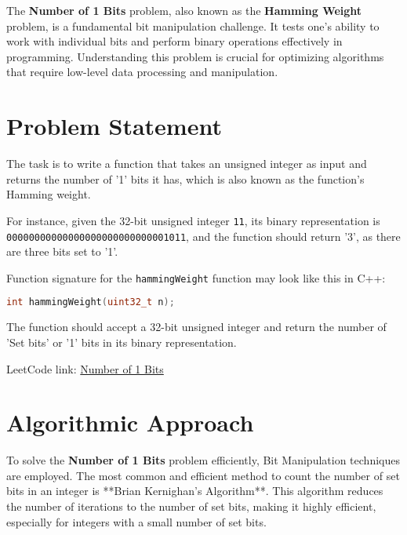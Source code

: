 
\label{chap:Number_of_1_Bits}

The \textbf{Number of 1 Bits} problem, also known as the \textbf{Hamming Weight} problem, is a fundamental bit manipulation challenge. It tests one's ability to work with individual bits and perform binary operations effectively in programming. Understanding this problem is crucial for optimizing algorithms that require low-level data processing and manipulation.

\section*{Problem Statement}

The task is to write a function that takes an unsigned integer as input and returns the number of '1' bits it has, which is also known as the function's Hamming weight.

For instance, given the 32-bit unsigned integer \texttt{11}, its binary representation is \texttt{00000000000000000000000000001011}, and the function should return '3', as there are three bits set to '1'.

Function signature for the \texttt{hammingWeight} function may look like this in C++:
\begin{lstlisting}[language=C++]
int hammingWeight(uint32_t n);
\end{lstlisting}

The function should accept a 32-bit unsigned integer and return the number of 'Set bits' or '1' bits in its binary representation.

LeetCode link: \href{https://leetcode.com/problems/number-of-1-bits/}{Number of 1 Bits}

\section*{Algorithmic Approach}

To solve the \textbf{Number of 1 Bits} problem efficiently, Bit Manipulation techniques are employed. The most common and efficient method to count the number of set bits in an integer is **Brian Kernighan’s Algorithm**. This algorithm reduces the number of iterations to the number of set bits, making it highly efficient, especially for integers with a small number of set bits.

